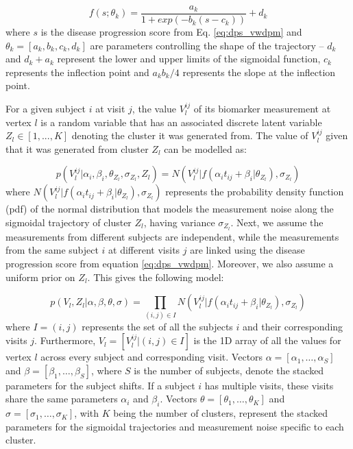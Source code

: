 \begin{equation}
\label{eq:dps_vwdpm2}
 f(s;\theta_k) = \frac{a_k}{1+exp(-b_k(s-c_k))} + d_k
\end{equation}
where $s$ is the disease progression score from Eq. \ref{eq:dps_vwdpm} and $\theta_k = [a_k, b_k, c_k, d_k]$ are parameters controlling the shape of the trajectory -- $d_k$ and $d_k + a_k$ represent the lower and upper limits of the sigmoidal function, $c_k$ represents the inflection point and $a_k b_k/4$ represents the slope at the inflection point. 

For a given subject $i$ at visit $j$, the value $V_l^{ij}$ of its biomarker measurement at vertex $l$ is a random variable that has an associated discrete latent variable $Z_l \in [1, ... , K]$ denoting the cluster it was generated from. The value of $V_l^{ij}$ given that it was generated from cluster $Z_l$ can be modelled as:

\begin{equation}
\label{eq:dps_vwdpm3}
 p(V_l^{ij} | \alpha_i, \beta_i, \theta_{Z_l}, \sigma_{Z_l}, Z_l) = N(V_l^{ij} | f(\alpha_i t_{ij} + \beta_i | \theta_{Z_l}), \sigma_{Z_l})
\end{equation}
where $N(V_l^{ij} | f(\alpha_i t_{ij} + \beta_i | \theta_{Z_l}), \sigma_{Z_l})$ represents the probability density function (pdf) of the normal distribution that models the measurement noise along the sigmoidal trajectory of cluster $Z_l$, having variance $\sigma_{Z_l}$. Next, we assume the measurements from different subjects are independent, while the measurements from the same subject $i$ at different visits $j$ are linked using the disease progression score from equation \ref{eq:dps_vwdpm}. Moreover, we also assume a uniform prior on $Z_l$. This gives the following model:

\begin{equation}
\label{eq:dps_vwdpm4}
 p(V_l, Z_l | \alpha, \beta, \theta, \sigma) = \prod_{(i,j) \in I} N(V_l^{ij} | f(\alpha_i t_{ij} + \beta_i | \theta_{Z_l}), \sigma_{Z_l})
\end{equation}
where $I = {(i,j)}$ represents the set of all the subjects $i$ and their corresponding visits $j$. Furthermore, $V_l = [V_l^{ij} | (i,j) \in I]$ is the 1D array of all the values for vertex $l$ across every subject and corresponding visit. Vectors $\alpha = [\alpha_1, \dots, \alpha_S]$ and $\beta = [\beta_1, \dots, \beta_S]$, where $S$ is the number of subjects, denote the stacked parameters for the subject shifts. If a subject $i$ has multiple visits, these visits share the same parameters $\alpha_i$ and $\beta_i$. Vectors $\theta = [\theta_1, \dots, \theta_K]$ and $\sigma = [\sigma_1, \dots, \sigma_K]$, with $K$ being the number of clusters, represent the stacked parameters for the sigmoidal trajectories and measurement noise specific to each cluster.

